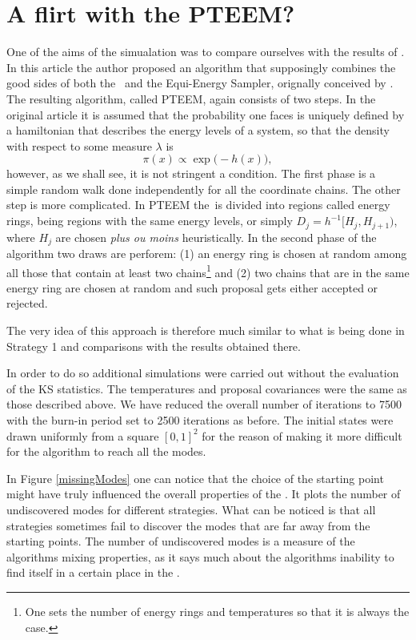 \documentclass{book}
\begin{document}
\section{A flirt with the PTEEM?}

One of the aims of the simualation was to compare ourselves with the results of \cite{BaragattiLikelihoodFreeParallelTempering}. In this article the author proposed an algorithm that supposingly combines the good sides of both the \PT\, and the Equi-Energy Sampler, orignally conceived by \cite{ Kuo2006}. The resulting algorithm, called PTEEM, again consists of two steps. In the original article it is assumed that the probability one faces is uniquely defined by a hamiltonian that describes the energy levels of a system, so that the density with respect to some measure $\lambda$ is
$$
	\pi(x) \propto \exp\Big(-h(x)\Big),
$$
however, as we shall see, it is not stringent a condition. The first phase is a simple random walk done independently for all the coordinate chains. The other step is more complicated. In PTEEM the \sspace\,is divided into regions called energy rings, being regions with the same energy levels, or simply $D_j = h^{-1}[H_j, H_{j+1})$, where $H_j$ are chosen {\it plus ou moins} heuristically. In the second phase of the algorithm two draws are perforem: (1) an energy ring is chosen at random among all those that contain at least two chains\footnote{One sets the number of energy rings and temperatures so that it is always the case.} and (2) two chains that are in the same energy ring are chosen at random and such proposal gets either accepted or rejected. 

The very idea of this approach is therefore much similar to what is being done in Strategy 1  and comparisons with the results obtained there.      

In order to do so additional simulations were carried out without the evaluation of the \textsc{KS} statistics. The temperatures and proposal covariances were the same as those described above. We have reduced the overall number of iterations to 7500 with the burn-in period set to 2500 iterations as before. The initial states were drawn uniformly from a square $[0,1]^2$ for the reason of making it more difficult for the algorithm to reach all the modes.  

In Figure \ref{missingModes} one can notice that the choice of the starting point might have truly influenced the overall properties of the \PT. It plots the number of undiscovered modes for different strategies. What can be noticed is that all strategies sometimes fail to discover the modes that are far away from the starting points. The number of undiscovered modes is a measure of the algorithms mixing properties, as it says much about the algorithms inability to find itself in a certain place in the \sspace. 
\end{document}
